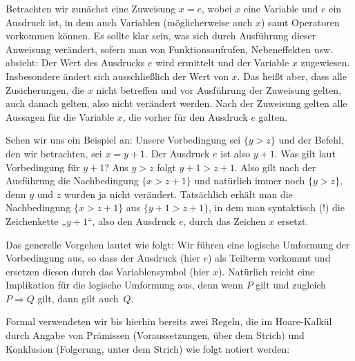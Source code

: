\vspace{\baselineskip} %


\vspace{\baselineskip} %

Betrachten wir zunächst eine Zuweisung $x = e$, wobei $x$ eine Variable und $e$ ein Ausdruck ist, in dem auch Variablen (möglicherweise auch $x$) samt Operatoren vorkommen können. Es sollte klar sein, was sich durch Ausführung dieser Anweisung verändert, sofern man von Funktionsaufrufen, Nebeneffekten usw. absieht: Der Wert des Ausdrucks $e$ wird ermittelt und der Variable $x$ zugewiesen. Insbesondere ändert sich ausschließlich der Wert von $x$. Das heißt aber, dass alle Zusicherungen, die $x$ nicht betreffen und vor Ausführung der Zuweisung gelten, auch danach gelten, also nicht verändert werden. Nach der Zuweisung gelten alle Aussagen für die Variable $x$, die vorher für den Ausdruck $e$ galten.

Sehen wir uns ein Beispiel an: Unsere Vorbedingung sei $\{y > z\}$ und der Befehl, den wir betrachten, sei $x = y + 1$. Der Ausdruck $e$ ist also $y + 1$. Was gilt laut Vorbedingung für $y+1$? Aus $y > z$ folgt $y + 1 > z + 1$. Also gilt nach der Ausführung die Nachbedingung $\{x > z + 1\}$ und natürlich immer noch $\{y>z\}$, denn $y$ und $z$ wurden ja nicht verändert. Tatsächlich erhält man die Nachbedingung $\{x > z + 1\}$ aus $\{ y + 1 > z + 1\}$, in dem man syntaktisch (!) die Zeichenkette „$y+1$“, also den Ausdruck $e$, durch das Zeichen $x$ ersetzt.

Das generelle Vorgehen lautet wie folgt: Wir führen eine logische Umformung der Vorbedingung aus, so dass der Ausdruck (hier $e$) als Teilterm vorkommt und ersetzen diesen durch das Variablensymbol (hier $x$). Natürlich reicht eine Implikation für die logische Umformung aus, denn wenn $P$ gilt und zugleich $P \Rightarrow Q$ gilt, dann gilt \mbox{auch $Q$}.

Formal verwendeten wir bis hierhin bereits zwei Regeln, die im Hoare-Kalkül durch Angabe von Prämissen (Voraussetzungen, über dem Strich) und Konklusion (Folgerung, unter dem Strich) wie folgt notiert werden:

